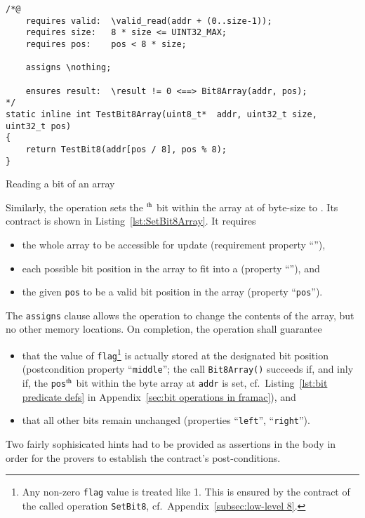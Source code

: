 \begin{listing}[hbt]
\begin{minipage}{0.99\textwidth}
\begin{lstlisting}[style=acsl-block]
/*@
    requires valid:  \valid_read(addr + (0..size-1));
    requires size:   8 * size <= UINT32_MAX;
    requires pos:    pos < 8 * size;

    assigns \nothing;

    ensures result:  \result != 0 <==> Bit8Array(addr, pos);
*/
static inline int TestBit8Array(uint8_t*  addr, uint32_t size, uint32_t pos)
{
    return TestBit8(addr[pos / 8], pos % 8);
}
\end{lstlisting}
\end{minipage}
\caption{\label{lst:TestBit8Array}Reading a bit of an  array}
\end{listing}










Similarly, the operation 
sets the
$^{\mbox{\scriptsize th}}$ bit within the array at
 of
byte-size  to .
%
Its contract is shown in Listing~\ref{lst:SetBit8Array}.
%
It requires
%
\begin{itemize}
\item the whole array to be accessible for update (requirement
	property ``''),
\item each possible bit position in the array to fit into a
	 (property ``''), and
\item the given \lstinline{pos} to be a valid bit position in the array
	(property ``\lstinline{pos}'').
\end{itemize}
%
The \lstinline{assigns} clause allows the operation to change the
contents of the array,
but no other memory locations.
%
On completion, the operation shall guarantee
\begin{itemize}
\item that the value of \lstinline{flag}\footnote{
		Any non-zero \lstinline{flag} value is treated like 1.
		This is ensured by the contract of the called operation
		\lstinline{SetBit8}, cf.\ Appendix~\ref{subsec:low-level 8}.
	}
	is actually stored at the designated bit
	position (postcondition property ``\lstinline{middle}'';
	the call \lstinline{Bit8Array()} succeeds if, and inly if, the
	\lstinline{pos}$^{\mbox{\scriptsize th}}$ bit within the byte
	array at \lstinline{addr} is set, 
	cf.\ Listing~\ref{lst:bit predicate defs} in
	Appendix~\ref{sec:bit operations in framac}), and
\item that all other bits remain unchanged 
	(properties ``\lstinline{left}'', ``\lstinline{right}'').
\end{itemize}
%
Two fairly sophisicated hints had to be provided as assertions in
the body in order for
the provers to establish the contract's post-conditions.









